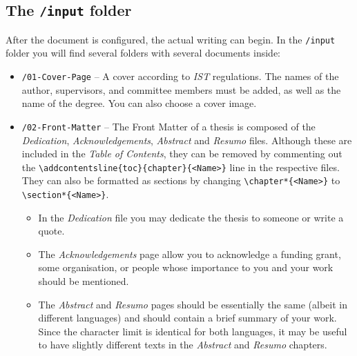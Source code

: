 \subsection{The {\normalfont\texttt{/input}} folder} %

After the document is configured, the actual writing can begin. In the \texttt{/input} folder you will find several folders with several documents inside:

\begin{itemize}
\item \texttt{/01-Cover-Page} -- A cover according to \textit{IST} regulations. The names of the author, supervisors, and committee members must be added, as well as the name of the degree. You can also choose a cover image.

\item \texttt{/02-Front-Matter} -- The Front Matter of a thesis is composed of the \textit{Dedication}, \textit{Acknowledgements}, \textit{Abstract} and \textit{Resumo} files. Although these are included in the \textit{Table of Contents}, they can be removed by commenting out the \Verb*|\addcontentsline{toc}{chapter}{<Name>}| line in the respective files. They can also be formatted as sections by changing \Verb*|\chapter*{<Name>}| to \Verb*|\section*{<Name>}|.
	
\begin{itemize}
	\item In the \textit{Dedication} file you may dedicate the thesis to someone or write a quote. 
	
	\item The \textit{Acknowledgements} page allow you to acknowledge a funding grant, some organisation, or people whose importance to you and your work should be mentioned. 
	
	\item The \textit{Abstract} and \textit{Resumo} pages should be essentially the same (albeit in different languages) and should contain a brief summary of your work. Since the character limit is identical for both languages, it may be useful to have slightly different texts in the \textit{Abstract} and \textit{Resumo} chapters. 
\end{itemize}	


\end{itemize}
